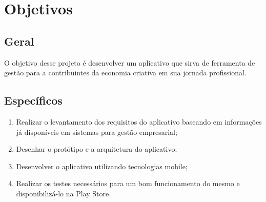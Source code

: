 \section{Objetivos}\label{sec:objetivos}

\subsection{Geral}\label{subsec:geral}

O objetivo desse projeto é desenvolver um aplicativo que sirva de ferramenta de gestão para a contribuintes da economia criativa em sua jornada profissional.

\subsection{Específicos}\label{subsec:especificos}

\begin{enumerate}
    \item Realizar o levantamento dos requisitos do aplicativo baseando em informações já disponíveis em sistemas para gestão empresarial;
    \item Desenhar o protótipo e a arquitetura do aplicativo;
    \item Desenvolver o aplicativo utilizando tecnologias mobile;
    \item Realizar os testes necessários para um bom funcionamento do mesmo e disponibilizá-lo na Play Store.
\end{enumerate}